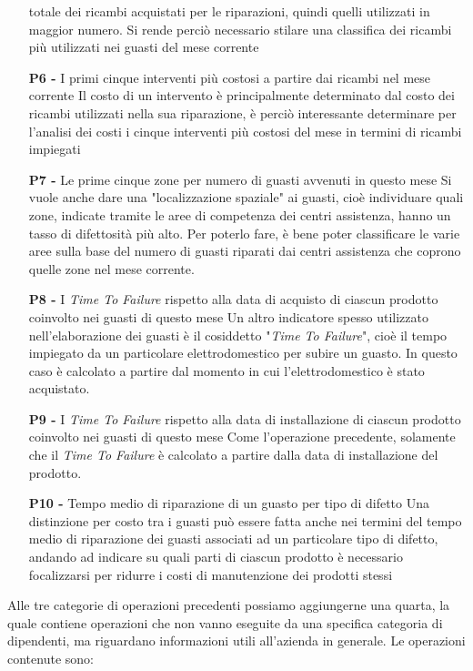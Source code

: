 \documentclass[a4paper, 12pt]{report}
\begin{document}
\begin{itemize}
		totale dei ricambi acquistati per le riparazioni, quindi quelli utilizzati in maggior numero. Si rende perciò necessario stilare una classifica dei ricambi più utilizzati nei guasti del 
		mese corrente
	\item[\textbf{P6 -}] I primi cinque interventi più costosi a partire dai ricambi nel mese corrente
		\subitem Il costo di un intervento è principalmente determinato dal costo dei ricambi utilizzati nella sua riparazione, è perciò interessante
		determinare per l'analisi dei costi i cinque interventi più costosi del mese in termini di ricambi impiegati
	\item[\textbf{P7 -}] Le prime cinque zone per numero di guasti avvenuti in questo mese
		\subitem Si vuole anche dare una "localizzazione spaziale" ai guasti, cioè individuare quali zone, indicate tramite le aree di competenza dei centri assistenza,
		hanno un tasso di difettosità più alto. Per poterlo fare, è bene poter classificare le varie aree sulla base del numero di guasti riparati dai centri assistenza
		che coprono quelle zone nel mese corrente.
	\item[\textbf{P8 -}] I \textit{Time To Failure} rispetto alla data di acquisto di ciascun prodotto coinvolto nei guasti di questo mese
		\subitem Un altro indicatore spesso utilizzato nell'elaborazione dei guasti è il cosiddetto "\textit{Time To Failure}", cioè il tempo impiegato da un particolare elettrodomestico
		per subire un guasto. In questo caso è calcolato a partire dal momento in cui l'elettrodomestico è stato acquistato.
	\item[\textbf{P9 -}] I \textit{Time To Failure} rispetto alla data di installazione di ciascun prodotto coinvolto nei guasti di questo mese
		\subitem Come l'operazione precedente, solamente che il \textit{Time To Failure} è calcolato a partire dalla data di installazione del prodotto.
	\item[\textbf{P10 -}] Tempo medio di riparazione di un guasto per tipo di difetto
		\subitem Una distinzione per costo tra i guasti può essere fatta anche nei termini del tempo medio di riparazione dei guasti associati ad un particolare tipo di difetto,
		andando ad indicare su quali parti di ciascun prodotto è necessario focalizzarsi per ridurre i costi di manutenzione dei prodotti stessi
\end{itemize}

\newpage

Alle tre categorie di operazioni precedenti possiamo aggiungerne una quarta, la quale contiene operazioni che non vanno eseguite da una specifica categoria di dipendenti,
ma riguardano informazioni utili all'azienda in generale. Le operazioni contenute sono:
\end{document}
